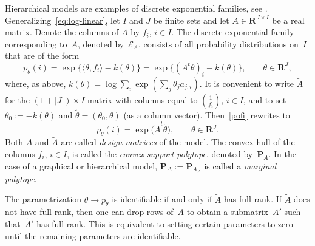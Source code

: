 \documentclass[aos,noinfoline]{imsart}
\def\R{{\mathbf R}}
\newcommand{\Ecal}{\mathcal{E}}
\newcommand{\Pbf}{\mathbf{P}}
\theoremstyle{remark}
\theoremstyle{definition}
\begin{document}


\medskip

Hierarchical models are examples of discrete exponential families, see
\citet{Barndorff:exponential_families,Fienberg:categorical,RKA10:Support_Sets_and_Or_Mat}.
Generalizing~\eqref{eq:log-linear}, let $I$ and $J$ be finite sets and let $A\in\R^{J\times I}$ be a real
matrix.  %
Denote the columns of $A$ by $f_{i}$, $i\in I$.  The discrete exponential family corresponding to~$A$, denoted
by~$\Ecal_{A}$, consists of all probability distributions on~$I$ that are of the form
\begin{equation}
\label{pofi}
  p_{\theta}(i) = \exp\big\{\langle \theta,f_{i}\rangle - k(\theta)\big\}
  = \exp\big\{(A^{t}\theta)_{i} - k(\theta)\big\}, \qquad \theta\in\R^{J},
\end{equation}
where, as above, $k(\theta) = \log \sum_{i}\exp(\sum_{j}\theta_{j}a_{j,i})$.
It is convenient to write $\tilde A$ for the $(1+|J|)\times I$ matrix with columns equal to $\binom{1}{f_{i}}$, $i\in I$, and to set $\theta_{0}:= -k(\theta)$ and $\tilde{\theta}=(\theta_{0}, \theta)$ (as a column vector).  Then~\eqref{pofi} rewrites to
\begin{equation}
  \label{eq:pofi2}
  p_{\theta}(i) = \exp\big(\tilde A^{t}\tilde\theta\big), \qquad \theta\in\R^{J}.
\end{equation}
Both $A$ and $\tilde A$ are called \emph{design matrices} of the model.
The convex hull of the columns $f_{i}$, $i\in I$, is called
the \emph{convex support polytope}, denoted by~$\Pbf_{A}$.  %
In the case of a graphical or hierarchical model, $\Pbf_{\Delta}:=\Pbf_{A_{\Delta}}$ is called a \emph{marginal polytope}.

The parametrization $\theta\to p_{\theta}$ is identifiable if and only if $\tilde A$ has full rank.
If $\tilde A$ does not have full rank, then one can drop rows of~$A$ to obtain a submatrix~$A'$ such
that~$\tilde A'$ has full rank.  This is equivalent to setting certain parameters to zero until the remaining parameters
are identifiable. 
\end{document}
